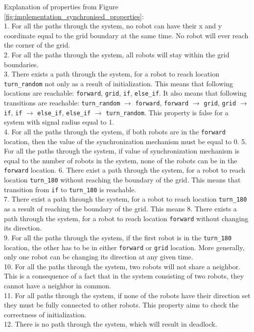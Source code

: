 \noindent
Explanation of properties from Figure \ref{fig:implementation_synchronised_properties}:\\
1. For all the paths through the system, no robot can have their x and y coordinate equal to the grid boundary at the same time. No robot will ever reach the corner of the grid.\\
2. For all the paths through the system, all robots will stay within the grid boundaries.\\
3. There exists a path through the system, for a robot to reach location \texttt{turn\_random} not only as a result of initialization. This means that following locations are reachable: \texttt{forward}, \texttt{grid}, \texttt{if}, \texttt{else\_if}. It also means that following transitions are reachable: \texttt{turn\_random} $\rightarrow$ \texttt{forward}, \texttt{forward} $\rightarrow$ \texttt{grid}, \texttt{grid} $\rightarrow$ \texttt{if}, \texttt{if} $\rightarrow$ \texttt{else\_if}, \texttt{else\_if} $\rightarrow$ \texttt{turn\_random}. This property is false for a system with signal radius equal to 1.\\ 
4. For all the paths through the system, if both robots are in the \texttt{forward} location, then the value of the synchronization mechanism must be equal to 0.
5. For all the paths through the system, if value of synchronization mechanism is equal to the number of robots in the system, none of the robots can be in the \texttt{forward} location.
6. There exist a path through the system, for a robot to reach location \texttt{turn\_180} without reaching the boundary of the grid. This means that transition from \texttt{if} to \texttt{turn\_180} is reachable.\\
7. There exist a path through the system, for a robot to reach location \texttt{turn\_180} as a result of reaching the boundary of the grid. This means 
8. There exists a path through the system, for a robot to reach location \texttt{forward} without changing its direction.\\
9. For all the paths through the system, if the first robot is in the \texttt{turn\_180} location, the other has to be in either \texttt{forward} or \texttt{grid} location. More generally, only one robot can be changing its direction at any given time.\\ 
10. For all the paths through the system, two robots will not share a neighbor. This is a consequence of a fact that in the system consisting of two robots, they cannot have a neighbor in common.\\
11. For all paths through the system, if none of the robots have their direction set they must be fully connected to other robots. This property aims to check the correctness of initialization. \\
12. There is no path through the system, which will result in deadlock.\\



